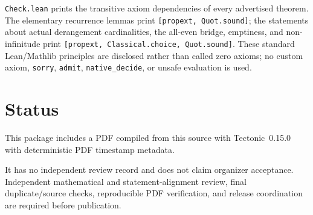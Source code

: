 \documentclass[11pt]{article}
\begin{document}
\texttt{Check.lean} prints the transitive axiom dependencies of every
advertised theorem.  The elementary recurrence lemmas print
{\footnotesize\texttt{[propext, Quot.sound]}}; the statements about actual derangement
cardinalities, the all-even bridge, emptiness, and non-infinitude print
{\footnotesize\texttt{[propext, Classical.choice, Quot.sound]}}.  These standard Lean/Mathlib
principles are disclosed rather than called zero axioms; no custom axiom,
\texttt{sorry}, \texttt{admit}, \texttt{native\_decide}, or unsafe evaluation
is used.

\section*{Status}
This package includes a PDF compiled from this source with Tectonic~0.15.0
with deterministic PDF timestamp metadata.

It has no independent review record and does not claim organizer acceptance.
Independent mathematical and statement-alignment review, final duplicate/source
checks, reproducible PDF verification, and release coordination are required
before publication.
\end{document}
